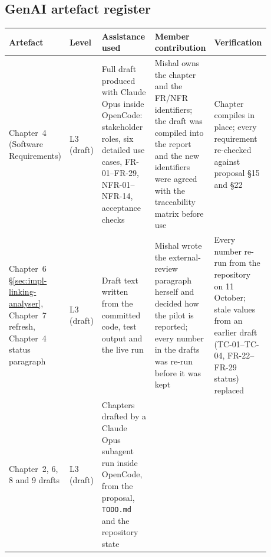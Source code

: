 %

\begin{landscape}
\subsection*{GenAI artefact register}
\begin{longtable}{>{\raggedright\arraybackslash}p{0.16\linewidth}>{\raggedright\arraybackslash}p{0.09\linewidth}>{\raggedright\arraybackslash}p{0.23\linewidth}>{\raggedright\arraybackslash}p{0.23\linewidth}>{\raggedright\arraybackslash}p{0.17\linewidth}}
\toprule
Artefact & Level & Assistance used & Member contribution & Verification \\
\midrule
\endhead
Chapter~4 (Software Requirements) & L3 (draft) &
  Full draft produced with Claude Opus inside OpenCode: stakeholder roles, six
  detailed use cases, FR-01--FR-29, NFR-01--NFR-14, acceptance checks &
  Mishal owns the chapter and the FR/NFR identifiers; the draft was compiled
  into the report and the new identifiers were agreed with the traceability
  matrix before use &
  Chapter compiles in place; every requirement re-checked against proposal
  \S15 and \S22 \\
Chapter~6 \S\ref{sec:impl-linking-analyser}, Chapter~7 refresh, Chapter~4 status
  paragraph & L3 (draft) &
  Draft text written from the committed code, test output and the live run &
  Mishal wrote the external-review paragraph herself and decided how the pilot
  is reported; every number in the drafts was re-run before it was kept &
  Every number re-run from the repository on 11 October; stale values from an
  earlier draft (TC-01--TC-04, FR-22--FR-29 status) replaced \\
Chapter~2, 6, 8 and 9 drafts & L3 (draft) &
  Chapters drafted by a Claude Opus subagent run inside OpenCode, from the
  proposal, \texttt{TODO.md} and the repository state &

\end{longtable}
\end{landscape}
